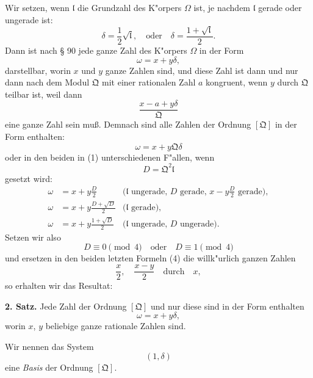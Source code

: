 \documentclass[12pt,a4paper]{article}
\theoremstyle{plain}
\begin{document}
Wir setzen, wenn $\mathfrak{l}$ die Grundzahl des K"orpers $\Omega$ ist, je nachdem $\mathfrak{l}$ gerade oder ungerade ist:
\begin{equation}
\delta = \frac{1}{2}\sqrt{\mathfrak{l}},\quad \text{oder}\quad \delta = \frac{1 + \sqrt{\mathfrak{l}}}{2}.
\tag{1}
\end{equation}
Dann ist nach \S{} 90 jede ganze Zahl des K"orpers $\Omega$ in der Form
\begin{equation}
\omega = x + y\delta,
\tag{2}
\end{equation}
darstellbar, worin $x$ und $y$ ganze Zahlen sind, und diese Zahl ist dann und nur dann nach dem Modul $\mathfrak{Q}$ mit einer rationalen Zahl $a$ kongruent, wenn $y$ durch $\mathfrak{Q}$ teilbar ist, weil dann
\[
\frac{x - a + y\delta}{\mathfrak{Q}}
\]
eine ganze Zahl sein mu\ss. Demnach sind alle Zahlen der Ordnung $[\mathfrak{Q}]$ in der Form enthalten:
\[
\omega = x + y\mathfrak{Q}\delta
\]
oder in den beiden in (1) unterschiedenen F"allen, wenn
\begin{equation}
D = \mathfrak{Q}^2\mathfrak{l}
\tag{3}
\end{equation}
gesetzt wird:
\begin{align*}
\omega &= x + y\frac{D}{2} & \text{($\mathfrak{l}$ ungerade, $D$ gerade, $x - y\frac{D}{2}$ gerade)},\\
\omega &= x + y\frac{D + \sqrt{D}}{2} & \text{($\mathfrak{l}$ gerade)},\\
\omega &= x + y\frac{1 + \sqrt{D}}{2} & \text{($\mathfrak{l}$ ungerade, $D$ ungerade)}.
\end{align*}
Setzen wir also
\begin{equation}
D \equiv 0 \pmod{4}\quad \text{oder}\quad D \equiv 1 \pmod{4}
\tag{4}
\end{equation}
und ersetzen in den beiden letzten Formeln (4) die willk"urlich ganzen Zahlen
\[
\frac{x}{2},\quad \frac{x - y}{2}\quad \text{durch}\quad x,
\]
so erhalten wir das Resultat:

\textbf{2. Satz.} Jede Zahl der Ordnung $[\mathfrak{Q}]$ und nur diese sind in der Form enthalten
\begin{equation}
\omega = x + y\delta,
\tag{6}
\end{equation}
worin $x$, $y$ beliebige ganze rationale Zahlen sind.

Wir nennen das System
\begin{equation}
(1, \delta)
\tag{7}
\end{equation}
eine \textit{Basis} der Ordnung $[\mathfrak{Q}]$.
\end{document}
